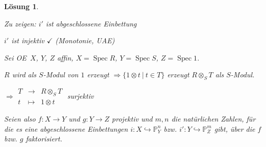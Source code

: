 \documentclass[paper = A4, fontsize=12pt, numbers=noendperiod, chapterprefix=true]{scrbook}
\theoremstyle{break}
\newtheorem{Loes}{L\"osung}
\theoremstyle{nonumberbreak}
\theoremstyle{nonumberplain}
\newcommand{\schraffiert}{\ensuremath{\nicefrac{\nicefrac{}{}}{\nicefrac{}{}}}}
\DeclareMathOperator{\Spec}{Spec}
\newcommand{\IP}{\mathbb{P}}%
\newcommand{\X}{\times}
\renewcommand{\OE}{O\!\!E~}
\begin{document}
\begin{Loes}
\begin{enumerate}[a)]
\begin{description}[\setlabelstyle{\bfseries}]
		\begin{minipage}[c]{0.3\textwidth}\end{minipage}
		\begin{minipage}[c]{0.55\textwidth}\emph{Zu zeigen:} $i'$ ist abgeschlossene Einbettung
	
		$i'$ ist injektiv $\checkmark$ (Monotonie, UAE)\end{minipage}
		
		Sei \OE $X$, $Y$, $Z$ affin, $X = \Spec R$, $Y = \Spec S$, $Z = \Spec 1$.
		
		\begin{minipage}[c]{0.3\textwidth}\end{minipage}
		\begin{minipage}[c]{0.55\textwidth}$R$ wird als $S$-Modul von $1$ erzeugt $\Rightarrow \{1 \otimes t \ \vert \ t \in T\}$ erzeugt $R \otimes_S T$ als $S$-Modul.
		
		$\Rightarrow \begin{array}{ccc} T &\to& R \otimes_S T \\ t &\mapsto& 1 \otimes t \end{array}$ surjektiv\end{minipage}
	\end{description}

	 Seien also $f \colon X \to Y$ und $g \colon Y \to Z$ projektiv und $m, n$ die natürlichen Zahlen, für die es eine abgeschlossene Einbettungen $i \colon X \hookrightarrow \IP^n_Y$ bzw. $i' \colon Y \hookrightarrow \IP^m_Z$ gibt, über die $f$ bzw. $g$ faktorisiert. 
 

\end{enumerate}
\end{Loes}
\end{document}
